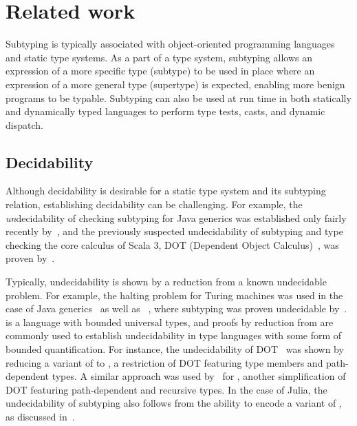 \chapter{Related work}\label{chap:5}

Subtyping is typically associated with object-oriented programming languages and
static type systems. As a part of a type system, subtyping allows
an expression of a more specific type (subtype) to be used in place
where an expression of a more general type (supertype) is expected,
enabling more benign programs to be typable.
Subtyping can also be used at run time
in both statically and dynamically typed languages to perform
type tests, casts, and dynamic dispatch.

\section{Decidability}

Although decidability is desirable for a static type system and its
subtyping relation, establishing decidability can be challenging.
For example, the \emph{un}decidability of checking subtyping for Java generics
was established only fairly recently by~\citet{grigore:java-undec:2017},
and the previously suspected undecidability of subtyping and type checking 
the core calculus of Scala 3,
DOT (Dependent Object Calculus)~\cite{amin:dot:2016},
was proven by~\citet{hu:dot-undec:2020}.

Typically, undecidability is shown by a reduction from a known undecidable
problem. For example, the halting problem for Turing machines was used in the
case of Java generics~\cite{grigore:java-undec:2017}
as well as \FSub~\cite{cardelli:fsub:1991}, where subtyping
was proven undecidable by~\citet{pierce:bound-sub-undec:1992}.
\FSub is a language with bounded universal types, and proofs by reduction
from \FSub are commonly used to establish undecidability in type languages
with some form of bounded quantification.
For instance, the undecidability of DOT~\citet{hu:dot-undec:2020} was shown
by reducing a variant of \FSub to \DSub, a restriction of DOT featuring type
members and path-dependent types. A similar approach was used
by~\citet{mackay:path-dep-dec:2020} for \WyvCore, another simplification of
DOT featuring path-dependent and recursive types.
In the case of Julia, the undecidability of subtyping also follows from the
ability to encode a variant of \FSub,
as discussed in~.

